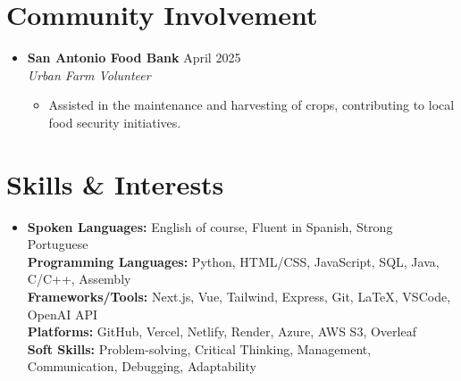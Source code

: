 \documentclass[letterpaper,10pt]{article}
\newcommand{\resumeItem}[1]{\item \small{#1}}
\begin{document}
\section*{Community Involvement}
\begin{itemize}
  \item[] 
  \textbf{San Antonio Food Bank} \hfill April 2025 \\
  \textit{Urban Farm Volunteer}
  \begin{itemize}[leftmargin=0.15in]
    \resumeItem{Assisted in the maintenance and harvesting of crops, contributing to local food security initiatives.}
  \end{itemize}
\end{itemize}

\section*{Skills \& Interests}
\begin{itemize}[leftmargin=0in]
  \item[]
    \textbf{Spoken Languages:} English of course, Fluent in Spanish, Strong Portuguese \\
    \textbf{Programming Languages:} Python, HTML/CSS, JavaScript, SQL, Java, C/C++, Assembly \\
    \textbf{Frameworks/Tools:} Next.js, Vue, Tailwind, Express, Git, LaTeX, VSCode, OpenAI API \\
    \textbf{Platforms:} GitHub, Vercel, Netlify, Render, Azure, AWS S3, Overleaf \\
    \textbf{Soft Skills:} Problem-solving, Critical Thinking, Management, Communication, Debugging, Adaptability
\end{itemize}
\end{document}
